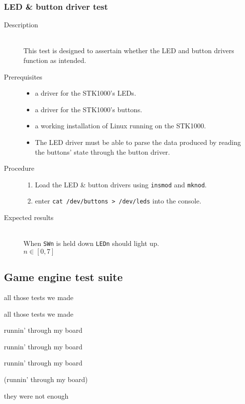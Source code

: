 	\subsubsection{LED \& button driver test}
		\begin{description}
			\item[Description] \hfill \\
				This test is designed to assertain whether the LED and button drivers function as intended.
			\item[Prerequisites] \hfill
				\begin{itemize}
					\item{a driver for the STK1000's LEDs.}
					\item{a driver for the STK1000's buttons.}
					\item{a working installation of Linux running on the STK1000.}
					\item{The LED driver must be able to parse the data produced by reading the buttons' state through the button driver.}
				\end{itemize}
			\item[Procedure] \hfill
				\begin{enumerate}
					\item{Load the LED \& button drivers using \texttt{insmod} and \texttt{mknod}.}
					\item{enter \texttt{cat /dev/buttons > /dev/leds} into the console.}
				\end{enumerate}
			\item[Expected results] \hfill \\
				When \texttt{SWn} is held down \texttt{LEDn} should light up.
				\\$n \in [0,7]$
		\end{description}	

\subsection{Game engine test suite}
	all those tests we made

	all those tests we made

	runnin' through my board

	runnin' through my board

	runnin' through my board

	(runnin' through my board)

	they were not enough

